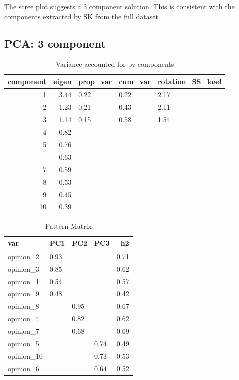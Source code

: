 \documentclass[]{article}
\begin{document}
The scree plot suggests a 3 component solution. This is consistent with
the components extracted by SK from the full dataset.

\hypertarget{pca-3-component-1}{%
\subsection{PCA: 3 component}\label{pca-3-component-1}}

\begin{table}[H]

\caption{\label{tab:unnamed-chunk-51}Variance accounted for by components}
\centering
\fontsize{6}{8}\selectfont
\begin{tabular}[t]{rrlll}
\toprule
component & eigen & prop\_var & cum\_var & rotation\_SS\_load\\
\midrule
1 & 3.44 & 0.22 & 0.22 & 2.17\\
2 & 1.23 & 0.21 & 0.43 & 2.11\\
3 & 1.14 & 0.15 & 0.58 & 1.54\\
4 & 0.82 &  &  & \\
5 & 0.76 &  &  & \\
\addlinespace
6 & 0.63 &  &  & \\
7 & 0.59 &  &  & \\
8 & 0.53 &  &  & \\
9 & 0.45 &  &  & \\
10 & 0.39 &  &  & \\
\bottomrule
\end{tabular}
\end{table}

\begin{table}[H]

\caption{\label{tab:unnamed-chunk-51}Pattern Matrix}
\centering
\fontsize{6}{8}\selectfont
\begin{tabular}[t]{llllr}
\toprule
var & PC1 & PC2 & PC3 & h2\\
\midrule
opinion\_2 & 0.93 &  &  & 0.71\\
opinion\_3 & 0.85 &  &  & 0.62\\
opinion\_1 & 0.54 &  &  & 0.57\\
opinion\_9 & 0.48 &  &  & 0.42\\
opinion\_8 &  & 0.95 &  & 0.67\\
\addlinespace
opinion\_4 &  & 0.82 &  & 0.62\\
opinion\_7 &  & 0.68 &  & 0.69\\
opinion\_5 &  &  & 0.74 & 0.49\\
opinion\_10 &  &  & 0.73 & 0.53\\
opinion\_6 &  &  & 0.64 & 0.52\\
\bottomrule
\end{tabular}
\end{table}
\end{document}
